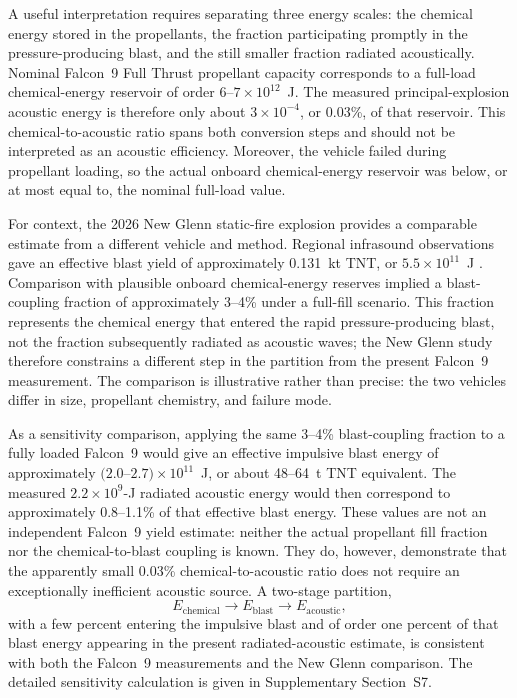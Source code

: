 \documentclass[]{seismica}
\begin{document}
A useful interpretation requires separating three energy scales:
the chemical energy stored in the propellants, the fraction participating
promptly in the pressure-producing blast, and the still smaller fraction
radiated acoustically. Nominal Falcon~9 Full Thrust propellant capacity
corresponds to a full-load chemical-energy reservoir of order
$6$--$7\times10^{12}$~J. The measured principal-explosion acoustic energy is
therefore only about $3\times10^{-4}$, or 0.03\%, of that reservoir. This
chemical-to-acoustic ratio spans both conversion steps and should not be
interpreted as an acoustic efficiency. Moreover, the vehicle failed during
propellant loading, so the actual onboard chemical-energy reservoir was below,
or at most equal to, the nominal full-load value.

For context, the 2026 New Glenn static-fire explosion provides a comparable
estimate from a different vehicle and method. Regional infrasound observations
gave an effective blast yield of approximately 0.131~kt TNT, or
$5.5\times10^{11}$~J \citep{silber_scamfer_newglenn_2026}. Comparison with
plausible onboard chemical-energy reserves implied a blast-coupling fraction
of approximately 3--4\% under a full-fill scenario. This fraction represents
the chemical energy that entered the rapid pressure-producing blast, not the
fraction subsequently radiated as acoustic waves; the New Glenn study therefore
constrains a different step in the partition from the present Falcon~9
measurement. The comparison is illustrative rather than precise: the two
vehicles differ in size, propellant chemistry, and failure mode.

As a sensitivity comparison, applying the same 3--4\% blast-coupling fraction
to a fully loaded Falcon~9 would give an effective impulsive blast energy of
approximately $(2.0$--$2.7)\times10^{11}$~J, or about 48--64~t TNT
equivalent. The measured $2.2\times10^9$-J radiated acoustic energy would then
correspond to approximately 0.8--1.1\% of that effective blast energy. These
values are not an independent Falcon~9 yield estimate: neither the actual
propellant fill fraction nor the chemical-to-blast coupling is known. They do,
however, demonstrate that the apparently small 0.03\% chemical-to-acoustic
ratio does not require an exceptionally inefficient acoustic source. A
two-stage partition,
\[
 E_{\mathrm{chemical}}
 \rightarrow E_{\mathrm{blast}}
 \rightarrow E_{\mathrm{acoustic}},
\]
with a few percent entering the impulsive blast and of order one percent of
that blast energy appearing in the present radiated-acoustic estimate, is
consistent with both the Falcon~9 measurements and the New Glenn comparison.
The detailed sensitivity calculation is given in Supplementary Section~S7.
\end{document}
